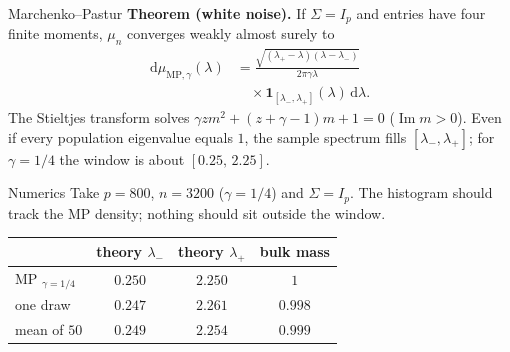 \documentclass{article}
\begin{document}
\begin{postercolumns}
\begin{postercolumn}

\begin{posterblock}{Marchenko--Pastur}
  \textbf{Theorem (white noise).}
  If $\Sigma=I_p$ and entries have four finite moments, $\mu_n$ converges
  weakly almost surely to
  \[
    \begin{aligned}
      \mathrm{d}\mu_{\mathrm{MP},\gamma}(\lambda)
      &=\frac{\sqrt{(\lambda_+-\lambda)(\lambda-\lambda_-)}}{2\pi\gamma\lambda} \\
      &\quad{}\times\mathbf{1}_{[\lambda_-,\lambda_+]}(\lambda)\,\mathrm{d}\lambda.
    \end{aligned}
  \]
  The Stieltjes transform solves
  $\gamma z m^2+(z+\gamma-1)m+1=0$ ($\operatorname{Im}m>0$).
  Even if every population eigenvalue equals $1$, the sample spectrum fills
  $[\lambda_-,\lambda_+]$; for $\gamma=1/4$ the window is about $[0.25,\,2.25]$.
\end{posterblock}

\posterblockgap

\begin{posterblock}[posterfeature]{Numerics}
  Take $p=800$, $n=3200$ ($\gamma=1/4$) and $\Sigma=I_p$.
  The histogram should track the MP density; nothing should sit outside the window.
  \begin{center}
  \end{center}
  \renewcommand{\arraystretch}{1.2}
  \begin{tabular*}{\linewidth}{@{\extracolsep{\fill}}lccc@{}}
    \toprule
    & theory $\lambda_-$ & theory $\lambda_+$ & bulk mass \\
    \midrule
    MP $_{\gamma=1/4}$ & $0.250$ & $2.250$ & $1$ \\
    one draw & $0.247$ & $2.261$ & $0.998$ \\
    mean of $50$ & $0.249$ & $2.254$ & $0.999$ \\
    \bottomrule
  \end{tabular*}
\end{posterblock}


\end{postercolumn}
\end{postercolumns}
\end{document}

